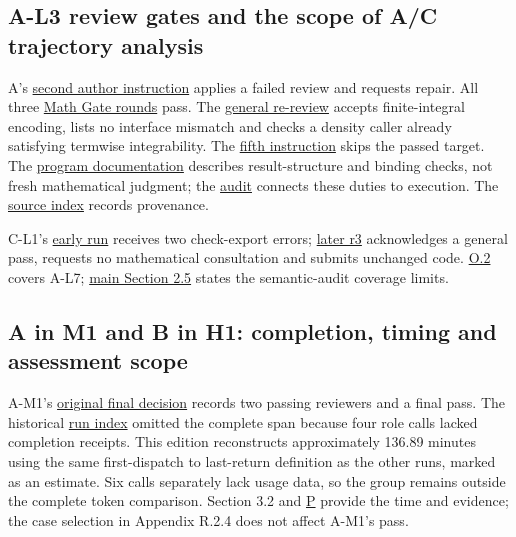 \subsection[A-L3 review gates and the scope of A/C trajectory analysis]{\texorpdfstring{\protect\hypertarget{o4}{}A-L3 review gates and the scope of A/C trajectory analysis}{A-L3 review gates and the scope of A/C trajectory analysis}}
A's \href{verification/revision14/l3/author-call-02.txt}{second author instruction} applies a failed review and requests repair. All three \href{verification/revision14/l3/math-gate-response.md}{Math Gate rounds} pass. The \href{verification/revision14/l3/general-v2.json}{general re-review} accepts finite-integral encoding, lists no interface mismatch and checks a density caller already satisfying termwise integrability. The \href{verification/revision14/l3/author-call-05.txt}{fifth instruction} skips the passed target. The \href{verification/revision14/l3/workspace_state.excerpt.md}{program documentation} describes result-structure and binding checks, not fresh mathematical judgment; the \href{verification/revision14/l3/gate-audit.zh-CN.md}{audit} connects these duties to execution. The \href{verification/revision14/SOURCE_INDEX.json}{source index} records provenance.

C-L1's \hyperlink{g9-2}{early run} receives two check-export errors; \hyperlink{g8}{later r3} acknowledges a general pass, requests no mathematical consultation and submits unchanged code. \hyperlink{o2}{O.2} covers A-L7; \href{en.pdf\#section-2-5}{main Section 2.5} states the semantic-audit coverage limits.

\subsection[A in M1 and B in H1: completion, timing and assessment scope]{\texorpdfstring{\protect\hypertarget{o5}{}A in M1 and B in H1: completion, timing and assessment scope}{A in M1 and B in H1: completion, timing and assessment scope}}
A-M1's \href{verification/revision18/a-m1-decision.json}{original final decision} records two passing reviewers and a final pass. The historical \href{manuscript/evidence/r9_rewrite_evidence/RUN_INDEX.csv}{run index} omitted the complete span because four role calls lacked completion receipts. This edition reconstructs approximately 136.89 minutes using the same first-dispatch to last-return definition as the other runs, marked as an estimate. Six calls separately lack usage data, so the group remains outside the complete token comparison. Section 3.2 and \hyperlink{appendix-p}{P} provide the time and evidence; the case selection in Appendix R.2.4 does not affect A-M1's pass.

